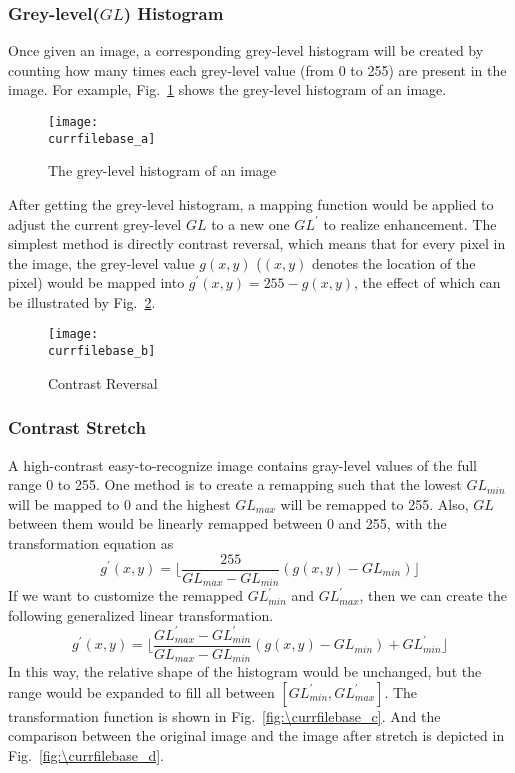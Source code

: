 \documentclass[catalog.tex]{subfiles}
\begin{document}
\subsubsection{Grey-level($GL$) Histogram}
Once given an image, a corresponding grey-level histogram will be created by counting how many times each grey-level value (from 0 to 255) are present in the image. For example, Fig.~\ref{fig:\currfilebase_a} shows the grey-level histogram of an image.

\begin{figure}[!htb]
    \centering
    \texttt{[image: \\currfilebase\_a]}
    \caption{The grey-level histogram of an image}
    \label{fig:\currfilebase_a}
\end{figure}

After getting the grey-level histogram, a mapping function would be applied to adjust the current grey-level $GL$ to a new one $GL^\prime$ to realize enhancement. The simplest method is directly contrast reversal, which means that for every pixel in the image, the grey-level value $g(x, y)$ ($(x, y)$ denotes the location of the pixel) would be mapped into $g^\prime(x, y) = 255 - g(x, y)$, the effect of which can be illustrated by Fig.~\ref{fig:\currfilebase_b}.

\begin{figure}
    \centering
    \texttt{[image: \\currfilebase\_b]}
    \caption{Contrast Reversal}
    \label{fig:\currfilebase_b}
\end{figure}

\subsubsection{Contrast Stretch}
A high-contrast easy-to-recognize image contains gray-level values of the full range 0 to 255. One method is to create a remapping such that the lowest $GL_{min}$ will be mapped to 0 and the highest $GL_{max}$ will be remapped to 255. Also, $GL$ between them would be linearly remapped between 0 and 255, with the transformation equation as
$$g^\prime(x,y) = \lfloor \frac{255}{GL_{max} - GL_{min}}(g(x, y) - GL_{min}) \rfloor$$
If we want to customize the remapped $GL^\prime_{min}$ and $GL^\prime_{max}$, then we can create the following generalized linear transformation.
$$g^\prime(x, y) = \lfloor \frac{GL^\prime_{max} - GL^\prime_{min}}{GL_{max} - GL_{min}}(g(x, y) - GL_{min}) + GL^\prime_{min} \rfloor$$
In this way, the relative shape of the histogram would be unchanged, but the range would be expanded to fill all between $[GL^\prime_{min}, GL^\prime_{max}]$. The transformation function is shown in Fig.~\ref{fig:\currfilebase_c}. And the comparison between the original image and the image after stretch is depicted in Fig.~\ref{fig:\currfilebase_d}.
\end{document}
